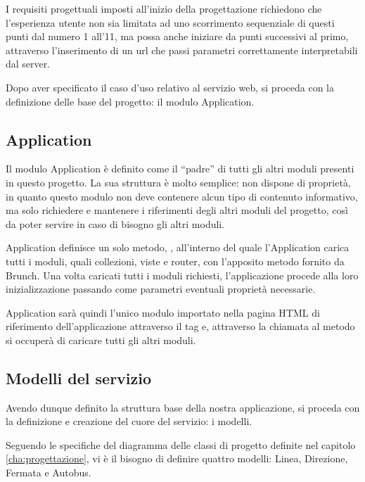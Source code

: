 I requisiti progettuali imposti all'inizio della progettazione richiedono che l'esperienza utente non sia limitata ad uno scorrimento sequenziale di questi punti dal numero 1 all'11, ma possa anche iniziare da punti successivi al primo, attraverso l'inserimento di un url che passi parametri correttamente interpretabili dal server.

Dopo aver specificato il caso d'uso relativo al servizio web, si proceda con la definizione delle base del progetto: il modulo Application.

\subsection{Application} %
\label{sub:application}

Il modulo Application è definito come il ``padre'' di tutti gli altri moduli presenti in questo progetto.
La sua struttura è molto semplice: non dispone di proprietà, in quanto questo modulo non deve contenere alcun tipo di contenuto informativo, ma solo richiedere e mantenere i riferimenti degli altri moduli del progetto, così da poter servire in caso di bisogno gli altri moduli.

Application definisce un solo metodo, , all'interno del quale l'Application carica tutti i moduli, quali collezioni, viste e router, con l'apposito metodo fornito da Brunch. Una volta caricati tutti i moduli richiesti, l'applicazione procede alla loro inizializzazione passando come parametri eventuali proprietà necessarie. 

Application sarà quindi l'unico modulo importato nella pagina HTML di riferimento dell'applicazione attraverso il tag  e, attraverso la chiamata al metodo  si occuperà di caricare tutti gli altri moduli.

\subsection{Modelli del servizio} %
\label{sub:modelli_del_servizio}

Avendo dunque definito la struttura base della nostra applicazione, si proceda con la definizione e creazione del cuore del servizio: i modelli.

Seguendo le specifiche del diagramma delle classi di progetto definite nel capitolo \ref{cha:progettazione}, vi è il bisogno di definire quattro modelli: Linea, Direzione, Fermata e Autobus.

